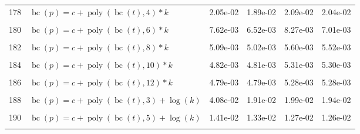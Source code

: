\documentclass[12pt,a4paper]{article}
\DeclareMathOperator{\bc}{bc}
\DeclareMathOperator{\poly}{poly}
\begin{document}
\begin{longtable}[t]{ll>{\raggedleft\arraybackslash}p{2cm}>{\raggedleft\arraybackslash}p{2cm}>{\raggedleft\arraybackslash}p{2cm}>{\raggedleft\arraybackslash}p{2cm}}
178 & $\bc(p) = c + \poly\left( \bc(t), 4 \right) * k$ & 2.05e-02 & 1.89e-02 & 2.09e-02 & 2.04e-02\\
\cellcolor{gray!6}{179} & \cellcolor{gray!6}{$\bc(p) = c + \poly\left( \bc(t), 5 \right) * k$} & \cellcolor{gray!6}{8.16e-03} & \cellcolor{gray!6}{7.98e-03} & \cellcolor{gray!6}{8.24e-03} & \cellcolor{gray!6}{8.18e-03}\\
180 & $\bc(p) = c + \poly\left( \bc(t), 6 \right) * k$ & 7.62e-03 & 6.52e-03 & 8.27e-03 & 7.01e-03\\
\cellcolor{gray!6}{181} & \cellcolor{gray!6}{$\bc(p) = c + \poly\left( \bc(t), 7 \right) * k$} & \cellcolor{gray!6}{5.59e-03} & \cellcolor{gray!6}{5.27e-03} & \cellcolor{gray!6}{5.88e-03} & \cellcolor{gray!6}{5.71e-03}\\
182 & $\bc(p) = c + \poly\left( \bc(t), 8 \right) * k$ & 5.09e-03 & 5.02e-03 & 5.60e-03 & 5.52e-03\\
\cellcolor{gray!6}{183} & \cellcolor{gray!6}{$\bc(p) = c + \poly\left( \bc(t), 9 \right) * k$} & \cellcolor{gray!6}{4.86e-03} & \cellcolor{gray!6}{4.85e-03} & \cellcolor{gray!6}{5.36e-03} & \cellcolor{gray!6}{5.34e-03}\\
184 & $\bc(p) = c + \poly\left( \bc(t), 10 \right) * k$ & 4.82e-03 & 4.81e-03 & 5.31e-03 & 5.30e-03\\
\cellcolor{gray!6}{185} & \cellcolor{gray!6}{$\bc(p) = c + \poly\left( \bc(t), 11 \right) * k$} & \cellcolor{gray!6}{4.80e-03} & \cellcolor{gray!6}{4.80e-03} & \cellcolor{gray!6}{5.28e-03} & \cellcolor{gray!6}{5.28e-03}\\
186 & $\bc(p) = c + \poly\left( \bc(t), 12 \right) * k$ & 4.79e-03 & 4.79e-03 & 5.28e-03 & 5.28e-03\\
\cellcolor{gray!6}{187} & \cellcolor{gray!6}{$\bc(p) = c + \poly\left( \bc(t), 13 \right) * k$} & \cellcolor{gray!6}{4.79e-03} & \cellcolor{gray!6}{4.79e-03} & \cellcolor{gray!6}{5.28e-03} & \cellcolor{gray!6}{5.28e-03}\\
188 & $\bc(p) = c + \poly\left( \bc(t), 3 \right) + \log(k)$ & 4.08e-02 & 1.91e-02 & 1.99e-02 & 1.94e-02\\
\cellcolor{gray!6}{189} & \cellcolor{gray!6}{$\bc(p) = c + \poly\left( \bc(t), 4 \right) + \log(k)$} & \cellcolor{gray!6}{2.39e-02} & \cellcolor{gray!6}{2.21e-02} & \cellcolor{gray!6}{2.36e-02} & \cellcolor{gray!6}{2.31e-02}\\
190 & $\bc(p) = c + \poly\left( \bc(t), 5 \right) + \log(k)$ & 1.41e-02 & 1.33e-02 & 1.27e-02 & 1.26e-02\\
\cellcolor{gray!6}{191} & \cellcolor{gray!6}{$\bc(p) = c + \poly\left( \bc(t), 6 \right) + \log(k)$} & \cellcolor{gray!6}{1.24e-02} & \cellcolor{gray!6}{1.19e-02} & \cellcolor{gray!6}{1.19e-02} & \cellcolor{gray!6}{1.13e-02}\\

\end{longtable}
\end{document}
